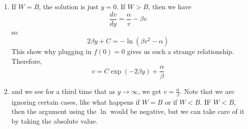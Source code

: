 \documentclass{article}
\begin{document}
\begin{enumerate}
\begin{enumerate}[label=(\alph*)]
        \item If $W=B$, the solution is just $y=0.$ If $W>B$, then we have
        \begin{equation}
            \frac{dv}{dy} = \frac{\alpha}{v} - \beta v
        \end{equation}
        so 
        \begin{equation}
            2\beta y + C = -\ln(\beta v^2 - \alpha)
        \end{equation}
        This show why plugging in $f(0)=0$ gives us such a strange relationship. Therefore, 
        \begin{equation}
            v = C\exp(-2\beta y) + \frac{\alpha}{\beta}
        \end{equation}
        \item and we see for a third time that as $y\to\infty$, we get $v=\frac{\alpha}{\beta}$. Note that we are ignoring certain cases, like what happens if $W=B$ or if $W<B$. IF $W<B$, then the argument using the $\ln$ would be negative, but we can take care of it by taking the absolute value.
    \end{enumerate}
\end{enumerate}
\end{document}
